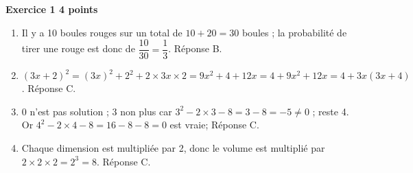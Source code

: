 \textbf{Exercice 1 \hfill 4 points}

\medskip

%
%
\begin{enumerate}
\item Il y a 10 boules rouges sur un total de $10 + 20 = 30$ boules ; la probabilité de tirer une rouge est donc de $\dfrac{10}{30} = \dfrac{1}{3}$. Réponse B.
\item $(3x + 2)^2 = (3x)^2 + 2^2 + 2 \times 3x\times 2 = 9x^2 + 4 + 12x = 4 + 9x^2 + 12x = 4 + 3x(3x + 4)$. Réponse C.
\item $0$ n'est pas solution ; 3 non plus car $3^2 - 2\times 3 - 8 = 3 - 8 = - 5 \ne 0$ ; reste 4. Or  $4^2 - 2 \times 4 - 8 = 16 - 8 - 8 = 0$ est vraie; Réponse C.
\item Chaque dimension est multipliée par 2, donc le volume est multiplié par $2 \times 2 \times 2 = 2^3 = 8$. Réponse C. 
\end{enumerate}

\bigskip

